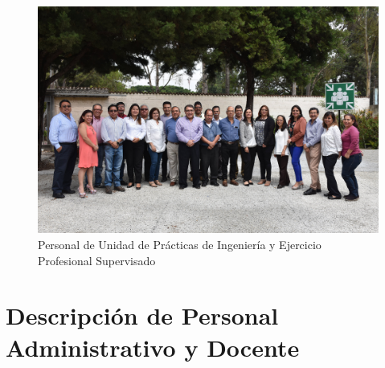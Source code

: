 \documentclass[12pt,spanish,Letterpaper,openany]{book}
\begin{document}
\begin{figure}[H]

{\centering \includegraphics[width=0.78\linewidth]{images/201901-unidadeps-imagen02} 

}

\caption{Personal de Unidad de Prácticas de Ingeniería y Ejercicio Profesional Supervisado}\label{fig:unnamed-chunk-15}
\end{figure}

\hypertarget{descripciuxf3n-de-personal-administrativo-y-docente}{%
\section*{Descripción de Personal Administrativo y Docente}\label{descripciuxf3n-de-personal-administrativo-y-docente}}
\end{document}

